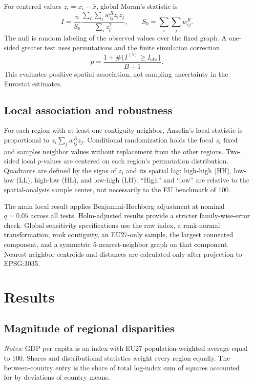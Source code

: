\documentclass[11pt,a4paper]{article}
\begin{document}
For centered values $z_i=x_i-\bar{x}$, global Moran's statistic is
\[
 I=\frac{n}{S_0}
   \frac{\sum_i\sum_j w_{ij}^{R}z_i z_j}
        {\sum_i z_i^2},
 \qquad S_0=\sum_i\sum_jw_{ij}^{R}.
\]
The null is random labeling of the observed values over the fixed graph. A
one-sided greater test uses \Permutations{} permutations and the finite
simulation correction
\[
 p=\frac{1+\#\{I^{(b)}\ge I_{\mathrm{obs}}\}}{B+1}.
\]
This evaluates positive spatial association, not sampling uncertainty in the
Eurostat estimates.

\subsection{Local association and robustness}

For each region with at least one contiguity neighbor, Anselin's local
statistic is proportional to $z_i\sum_j w_{ij}^{R}z_j$. Conditional
randomization holds the focal $z_i$ fixed and samples neighbor values without
replacement from the other regions.
Two-sided local $p$-values are centered on each region's permutation
distribution. Quadrants are defined by the signs of $z_i$ and its spatial lag:
high-high (HH), low-low (LL), high-low (HL), and low-high (LH). ``High'' and
``low'' are relative to the spatial-analysis sample center, not necessarily to
the EU benchmark of 100.

The main local result applies Benjamini-Hochberg adjustment at nominal
$q=0.05$ across all \MoranN{} tests. Holm-adjusted results provide a stricter
family-wise-error check. Global sensitivity specifications use the raw index,
a rank-normal transformation, rook contiguity, an EU27-only sample, the
largest connected component, and a symmetric 5-nearest-neighbor graph on that
component. Nearest-neighbor centroids and distances are calculated only after
projection to EPSG:3035.

\section{Results}

\subsection{Magnitude of regional disparities}

\begin{table}[H]
\centering
\caption{Region-equal descriptive statistics, 2023}
\label{tab:descriptive}

\begin{minipage}{0.82\textwidth}
\vspace{0.4em}\footnotesize
\textit{Notes:} GDP per capita is an index with EU27 population-weighted
average equal to 100. Shares and distributional statistics weight every
region equally. The between-country entry is the share of total log-index sum
of squares accounted for by deviations of country means.
\end{minipage}
\end{table}
\end{document}
